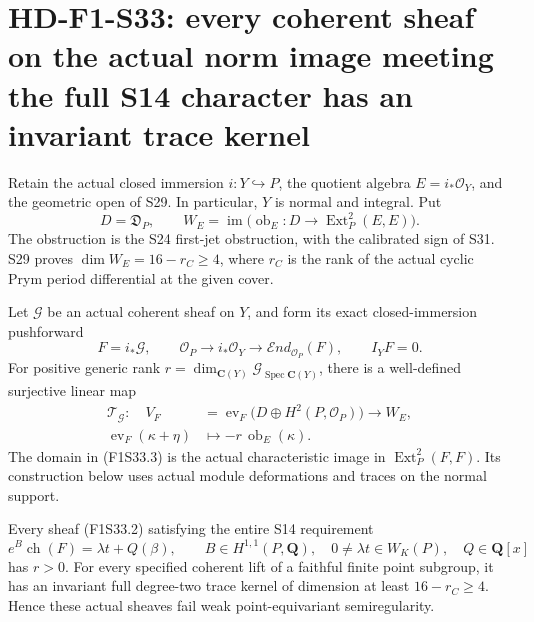 \section[HD-F1-S33: coherent sheaves on the actual norm image]{HD-F1-S33: every coherent sheaf on the actual norm image meeting the full S14 character has an invariant trace kernel}
\label{sec:f1-norm-fourfold-coherent-support}

Retain the actual closed immersion $i:Y\hookrightarrow P$,
the quotient algebra $E=i_*\mathcal O_Y$, and the geometric
open of S29. In particular, $Y$ is normal and integral.
Put
\[
 D=\mathfrak D_P,\qquad
 W_E=\operatorname{im}\bigl(
     \operatorname{ob}_E:D\longrightarrow
                    \operatorname{Ext}^2_P(E,E)\bigr).
 \tag{F1S33.1}
\]
The obstruction is the S24 first-jet obstruction, with
the calibrated sign of S31. S29 proves
$\dim W_E=16-r_C\ge4$, where $r_C$ is the rank of the
actual cyclic Prym period differential at the given cover.

Let $\mathcal G$ be an actual coherent sheaf on $Y$, and
form its exact closed-immersion pushforward
\[
 F=i_*\mathcal G,\qquad
 \mathcal O_P\longrightarrow i_*\mathcal O_Y
       \longrightarrow\mathcal End_{\mathcal O_P}(F),
 \qquad I_YF=0.
 \tag{F1S33.2}
\]
For positive generic rank
$r=\dim_{\mathbf C(Y)}\mathcal G_{\operatorname{Spec}\mathbf C(Y)}$,
there is a well-defined surjective linear map
\[
\begin{split}
 \mathcal T_{\mathcal G}:\quad
 V_F&=\operatorname{ev}_F
             \bigl(D\oplus H^2(P,\mathcal O_P)\bigr)
                  \longrightarrow W_E,\\
 \operatorname{ev}_F(\kappa+\eta)
        &\longmapsto-r\,\operatorname{ob}_E(\kappa).
\end{split}
 \tag{F1S33.3}
\]
The domain in (F1S33.3) is the actual characteristic
image in $\operatorname{Ext}^2_P(F,F)$.
Its construction below uses actual module deformations
and traces on the normal support.

Every sheaf (F1S33.2) satisfying the entire S14 requirement
\[
 e^B\operatorname{ch}(F)=\lambda t+Q(\beta),
 \qquad B\in H^{1,1}(P,\mathbf Q),\quad
 0\ne\lambda t\in W_K(P),\quad Q\in\mathbf Q[x]
 \tag{F1S33.4}
\]
has $r>0$. For every specified coherent lift of a faithful
finite point subgroup, it has an invariant full
degree-two trace kernel of dimension at least
$16-r_C\ge4$. Hence these actual sheaves fail weak
point-equivariant semiregularity.

